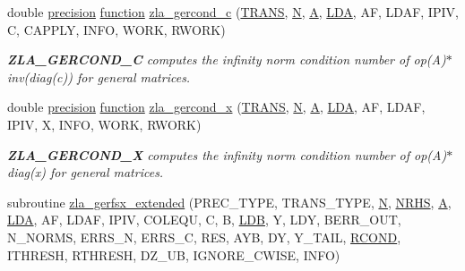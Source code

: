 \begin{DoxyCompactItemize}
double \hyperlink{numinquire_8h_a2c8e616467665d0b2814d4c1589ba74e}{precision} \hyperlink{afunc_8m_a7b5e596df91eadea6c537c0825e894a7}{function} \hyperlink{group__complex16GEcomputational_gab08ab71400afba05aff8565ab8d3d4e0}{zla\+\_\+gercond\+\_\+c} (\hyperlink{superlu__enum__consts_8h_a0c4e17b2d5cea33f9991ccc6a6678d62a1f61e3015bfe0f0c2c3fda4c5a0cdf58}{T\+R\+A\+N\+S}, \hyperlink{polmisc_8c_a0240ac851181b84ac374872dc5434ee4}{N}, \hyperlink{classA}{A}, \hyperlink{example__user_8c_ae946da542ce0db94dced19b2ecefd1aa}{L\+D\+A}, A\+F, L\+D\+A\+F, I\+P\+I\+V, C, C\+A\+P\+P\+L\+Y, I\+N\+F\+O, W\+O\+R\+K, R\+W\+O\+R\+K)
\begin{DoxyCompactList}\small\item\em {\bfseries Z\+L\+A\+\_\+\+G\+E\+R\+C\+O\+N\+D\+\_\+\+C} computes the infinity norm condition number of op(\+A)$\ast$inv(diag(c)) for general matrices. \end{DoxyCompactList}\item 
double \hyperlink{numinquire_8h_a2c8e616467665d0b2814d4c1589ba74e}{precision} \hyperlink{afunc_8m_a7b5e596df91eadea6c537c0825e894a7}{function} \hyperlink{group__complex16GEcomputational_gae625c625f36963209b3b3ddd640b6305}{zla\+\_\+gercond\+\_\+x} (\hyperlink{superlu__enum__consts_8h_a0c4e17b2d5cea33f9991ccc6a6678d62a1f61e3015bfe0f0c2c3fda4c5a0cdf58}{T\+R\+A\+N\+S}, \hyperlink{polmisc_8c_a0240ac851181b84ac374872dc5434ee4}{N}, \hyperlink{classA}{A}, \hyperlink{example__user_8c_ae946da542ce0db94dced19b2ecefd1aa}{L\+D\+A}, A\+F, L\+D\+A\+F, I\+P\+I\+V, X, I\+N\+F\+O, W\+O\+R\+K, R\+W\+O\+R\+K)
\begin{DoxyCompactList}\small\item\em {\bfseries Z\+L\+A\+\_\+\+G\+E\+R\+C\+O\+N\+D\+\_\+\+X} computes the infinity norm condition number of op(\+A)$\ast$diag(x) for general matrices. \end{DoxyCompactList}\item 
subroutine \hyperlink{group__complex16GEcomputational_gaf04f5fc86ce0bcd42d8eed61cf927692}{zla\+\_\+gerfsx\+\_\+extended} (P\+R\+E\+C\+\_\+\+T\+Y\+P\+E, T\+R\+A\+N\+S\+\_\+\+T\+Y\+P\+E, \hyperlink{polmisc_8c_a0240ac851181b84ac374872dc5434ee4}{N}, \hyperlink{example__user_8c_aa0138da002ce2a90360df2f521eb3198}{N\+R\+H\+S}, \hyperlink{classA}{A}, \hyperlink{example__user_8c_ae946da542ce0db94dced19b2ecefd1aa}{L\+D\+A}, A\+F, L\+D\+A\+F, I\+P\+I\+V, C\+O\+L\+E\+Q\+U, C, B, \hyperlink{example__user_8c_a50e90a7104df172b5a89a06c47fcca04}{L\+D\+B}, Y, L\+D\+Y, B\+E\+R\+R\+\_\+\+O\+U\+T, N\+\_\+\+N\+O\+R\+M\+S, E\+R\+R\+S\+\_\+\+N, E\+R\+R\+S\+\_\+\+C, R\+E\+S, A\+Y\+B, D\+Y, Y\+\_\+\+T\+A\+I\+L, \hyperlink{superlu__enum__consts_8h_af00a42ecad444bbda75cde1b64bd7e72a9b5c151728d8512307565994c89919d5}{R\+C\+O\+N\+D}, I\+T\+H\+R\+E\+S\+H, R\+T\+H\+R\+E\+S\+H, D\+Z\+\_\+\+U\+B, I\+G\+N\+O\+R\+E\+\_\+\+C\+W\+I\+S\+E, I\+N\+F\+O)

\end{DoxyCompactItemize}
